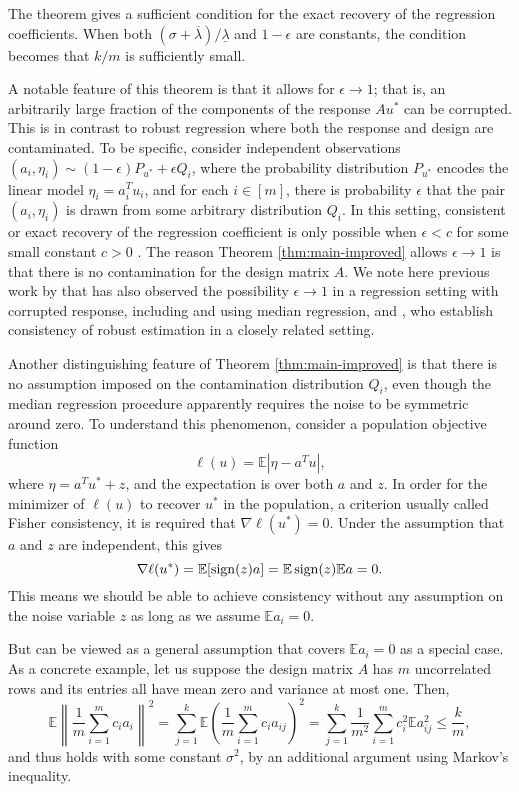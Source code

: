 The theorem gives a sufficient condition for the exact recovery of the regression coefficients. When both $(\sigma+\overline{\lambda})/\underline{\lambda}$ and $1-\epsilon$ are constants, the condition becomes that $k/m$ is sufficiently small.

A notable feature of this theorem is that it allows for $\epsilon \rightarrow 1$; that is, an arbitrarily large fraction of the components of the response $Au^*$ can be corrupted. This is in contrast to robust regression where both the response and design are contaminated. To be specific, consider independent observations $(a_i,\eta_i)\sim (1-\epsilon)P_{u^*}+\epsilon Q_i$, where the probability distribution $P_{u^*}$ encodes the linear model $\eta_i=a_i^Tu_i$, and for each $i\in[m]$, there is probability $\epsilon$ that the pair $(a_i,\eta_i)$ is drawn from some arbitrary distribution $Q_i$. In this setting, consistent or exact recovery of the regression coefficient is only possible when $\epsilon<c$ for some small constant $c>0$ \citep{gao2020}. The reason Theorem \ref{thm:main-improved} allows $\epsilon\rightarrow 1$ is that there is no contamination for the design matrix $A$. We note here previous work by that has also observed the possibility $\epsilon\to 1$ in
a regression setting with corrupted response, including \cite{wright} and \cite{nguyen1,nguyen2} using median regression, and \cite{bhatia}, who establish consistency of robust estimation in a closely related setting.

Another distinguishing feature of Theorem \ref{thm:main-improved} is that there is no assumption imposed on the contamination distribution $Q_i$, even though the median regression procedure apparently requires the noise to be symmetric around zero. To understand this phenomenon, consider a population objective function
$$\ell(u)=\mathbb{E}|\eta - a^Tu|,$$
where $\eta=a^Tu^*+z$, and the expectation is over both $a$ and $z$. In order for the minimizer of $\ell(u)$ to recover $u^*$ in the population, a criterion usually called Fisher consistency, it is required that $\nabla\ell(u^*)=0$. Under the assumption that $a$ and $z$ are independent, this gives
\begin{equation}
\nabla\ell(u^*)=\mathbb{E}[\sgn(z)a]=\mathbb{E}\sgn(z)\mathbb{E}a=0. \label{eq:pop-insight}
\end{equation}
This means we should be able to achieve consistency without any assumption on the noise variable $z$ as long as we assume $\mathbb{E}a_i=0$.

But \conditionA{} can be viewed as a general assumption that covers $\mathbb{E}a_i=0$ as a special case. As a concrete example, let us suppose the design matrix $A$ has $m$ uncorrelated rows and its entries all have mean zero and variance at most one. Then,
$$\mathbb{E}\left\|\frac{1}{m}\sum_{i=1}^mc_ia_i\right\|^2=\sum_{j=1}^k\mathbb{E}\left(\frac{1}{m}\sum_{i=1}^mc_ia_{ij}\right)^2=\sum_{j=1}^k\frac{1}{m^2}\sum_{i=1}^mc_i^2\mathbb{E}a_{ij}^2\leq \frac{k}{m},$$
and thus \conditionA{} holds with some constant $\sigma^2$, by an additional argument using Markov's inequality.

